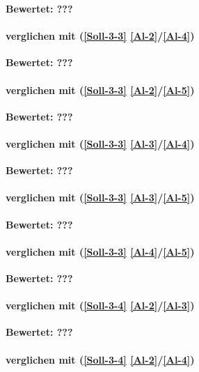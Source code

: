 \textbf{Bewertet: ???}

\paragraph*{  verglichen mit  (\ref{Soll-3-3} \ref{Al-2}/\ref{Al-4})}

\textbf{Bewertet: ???}

\paragraph*{  verglichen mit  (\ref{Soll-3-3} \ref{Al-2}/\ref{Al-5})}

\textbf{Bewertet: ???}

\paragraph*{  verglichen mit  (\ref{Soll-3-3} \ref{Al-3}/\ref{Al-4})}

\textbf{Bewertet: ???}

\paragraph*{  verglichen mit  (\ref{Soll-3-3} \ref{Al-3}/\ref{Al-5})}

\textbf{Bewertet: ???}


\paragraph*{  verglichen mit  (\ref{Soll-3-3} \ref{Al-4}/\ref{Al-5})}

\textbf{Bewertet: ???}

\paragraph*{  verglichen mit  (\ref{Soll-3-4} \ref{Al-2}/\ref{Al-3})}

\textbf{Bewertet: ???}

\paragraph*{  verglichen mit  (\ref{Soll-3-4} \ref{Al-2}/\ref{Al-4})}

